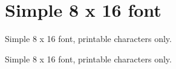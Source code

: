 \hypertarget{group__csb337__font}{}\section{Simple 8 x 16 font}
\label{group__csb337__font}


Simple 8 x 16 font, printable characters only.  


Simple 8 x 16 font, printable characters only. 

